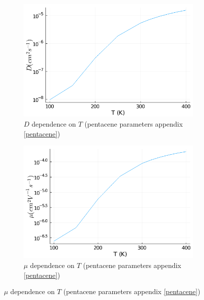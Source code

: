 \begin{figure}[htbp]
    \centering
    \begin{subfigure}[t]{0.49\textwidth}
        \centering
        \includegraphics*[width=\textwidth]{figures/3_elec/d_t.png}
        \caption{$D$ dependence on $T$ (pentacene parameters appendix \ref{pentacene})\label{fig:3_20}}
    \end{subfigure}
    \begin{subfigure}[t]{0.49\textwidth}
        \centering
        \includegraphics*[width=\textwidth]{figures/3_elec/mu_t.png}
        \caption{$\mu$ dependence on $T$ (pentacene parameters appendix \ref{pentacene})\label{fig:3_21}}
    \end{subfigure}
\end{figure}

